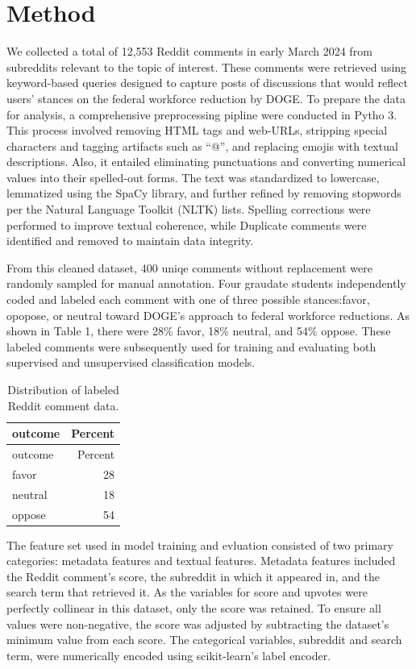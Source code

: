 \documentclass[
  12pt]{article}
\begin{document}
\section{Method}\label{sec-meth}

We collected a total of 12,553 Reddit comments in early March 2024 from
subreddits relevant to the topic of interest. These comments were
retrieved using keyword-based queries designed to capture posts of
discussions that would reflect users' stances on the federal workforce
reduction by DOGE. To prepare the data for analysis, a comprehensive
preprocessing pipline were conducted in Pytho 3. This process involved
removing HTML tags and web-URLs, stripping special characters and
tagging artifacts such as ``@'', and replacing emojis with textual
descriptions. Also, it entailed eliminating punctuations and converting
numerical values into their spelled-out forms. The text was standardized
to lowercase, lemmatized using the SpaCy library, and further refined by
removing stopwords per the Natural Language Toolkit (NLTK) lists.
Spelling corrections were performed to improve textual coherence, while
Duplicate comments were identified and removed to maintain data
integrity.

From this cleaned dataset, 400 uniqe comments without replacement were
randomly sampled for manual annotation. Four graudate students
independently coded and labeled each comment with one of three possible
stances:favor, opopose, or neutral toward DOGE's approach to federal
workforce reductions. As shown in Table 1, there were 28\% favor, 18\%
neutral, and 54\% oppose. These labeled comments were subsequently used
for training and evaluating both supervised and unsupervised
classification models.

\begin{longtable}[]{@{}lr@{}}
\caption{Distribution of labeled Reddit comment data.}\tabularnewline
\toprule\noalign{}
outcome & Percent \\
\midrule\noalign{}
\endfirsthead
\toprule\noalign{}
outcome & Percent \\
\midrule\noalign{}
\endhead
\bottomrule\noalign{}
\endlastfoot
favor & 28 \\
neutral & 18 \\
oppose & 54 \\
\end{longtable}

The feature set used in model training and evluation consisted of two
primary categories: metadata features and textual features. Metadata
features included the Reddit comment's score, the subreddit in which it
appeared in, and the search term that retrieved it. As the variables for
score and upvotes were perfectly collinear in this dataset, only the
score was retained. To ensure all values were non-negative, the score
was adjusted by subtracting the dataset's minimum value from each score.
The categorical variables, subreddit and search term, were numerically
encoded using scikit-learn's label encoder.
\end{document}
